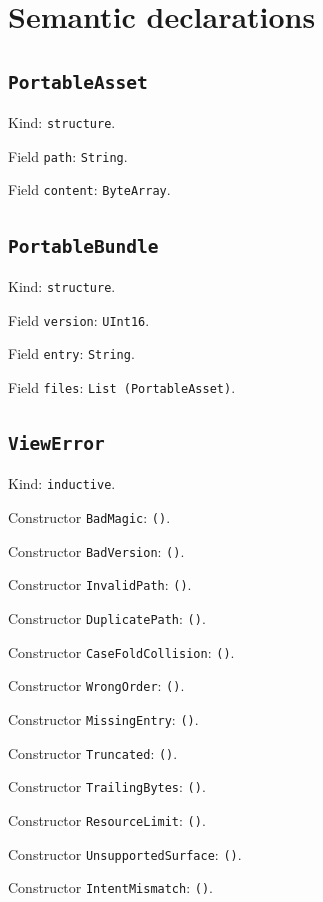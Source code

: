 \documentclass[11pt]{article}
\begin{document}
\section*{Semantic declarations}
\subsection*{\texttt{PortableAsset}}
\noindent Kind: \texttt{structure}.\par
\noindent Field \texttt{path}: \texttt{String}.\par
\noindent Field \texttt{content}: \texttt{ByteArray}.\par
\subsection*{\texttt{PortableBundle}}
\noindent Kind: \texttt{structure}.\par
\noindent Field \texttt{version}: \texttt{UInt16}.\par
\noindent Field \texttt{entry}: \texttt{String}.\par
\noindent Field \texttt{files}: \texttt{List (PortableAsset)}.\par
\subsection*{\texttt{ViewError}}
\noindent Kind: \texttt{inductive}.\par
\noindent Constructor \texttt{BadMagic}: \texttt{()}.\par
\noindent Constructor \texttt{BadVersion}: \texttt{()}.\par
\noindent Constructor \texttt{InvalidPath}: \texttt{()}.\par
\noindent Constructor \texttt{DuplicatePath}: \texttt{()}.\par
\noindent Constructor \texttt{CaseFoldCollision}: \texttt{()}.\par
\noindent Constructor \texttt{WrongOrder}: \texttt{()}.\par
\noindent Constructor \texttt{MissingEntry}: \texttt{()}.\par
\noindent Constructor \texttt{Truncated}: \texttt{()}.\par
\noindent Constructor \texttt{TrailingBytes}: \texttt{()}.\par
\noindent Constructor \texttt{ResourceLimit}: \texttt{()}.\par
\noindent Constructor \texttt{UnsupportedSurface}: \texttt{()}.\par
\noindent Constructor \texttt{IntentMismatch}: \texttt{()}.\par
\end{document}
